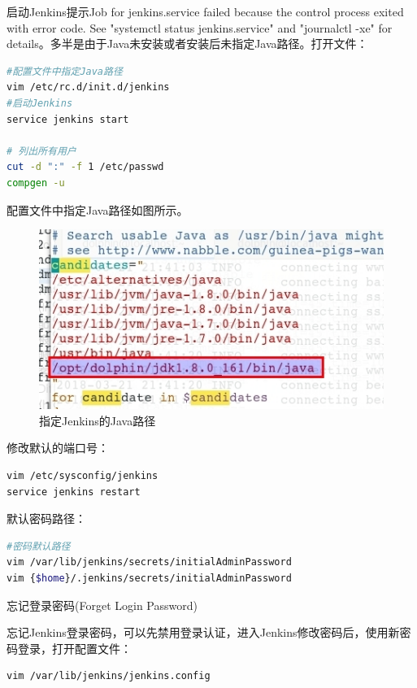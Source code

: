 \documentclass[12pt]{book}
\makeatletter
\numberwithin{dummy}{section}
\theoremstyle{ocrenumbox}
\theoremstyle{blacknumex}
\theoremstyle{blacknumbox}
\theoremstyle{ocrenum}
\renewcommand{\subsection}{\@startsection {subsection}{2}{\z@}
	{-3ex \@plus -0.1ex \@minus -.4ex}
	{0.5ex \@plus.2ex }
	{\normalfont\sffamily\bfseries}}
\makeatother
\begin{document}
启动Jenkins提示Job for jenkins.service failed because the control process exited with error code. See "systemctl status jenkins.service" and "journalctl -xe" for details。多半是由于Java未安装或者安装后未指定Java路径。打开文件：

\begin{lstlisting}[language=bash]
#配置文件中指定Java路径
vim /etc/rc.d/init.d/jenkins
#启动Jenkins
service jenkins start

# 列出所有用户
cut -d ":" -f 1 /etc/passwd
compgen -u
\end{lstlisting}

配置文件中指定Java路径如图所示。

\begin{figure}[htbp]
	\centering
	\includegraphics[scale=0.5]{specifyjavapath.jpg}
	\caption{指定Jenkins的Java路径}
	\label{fig:specifyjavapath}
\end{figure}

修改默认的端口号：

\begin{lstlisting}[language=bash]
vim /etc/sysconfig/jenkins
service jenkins restart
\end{lstlisting}

默认密码路径：

\begin{lstlisting}[language=bash]
#密码默认路径
vim /var/lib/jenkins/secrets/initialAdminPassword
vim {$home}/.jenkins/secrets/initialAdminPassword
\end{lstlisting}


\subsection{忘记登录密码(Forget Login Password)}

忘记Jenkins登录密码，可以先禁用登录认证，进入Jenkins修改密码后，使用新密码登录，打开配置文件：

\begin{lstlisting}[language=bash]
vim /var/lib/jenkins/jenkins.config
\end{lstlisting}
\end{document}

